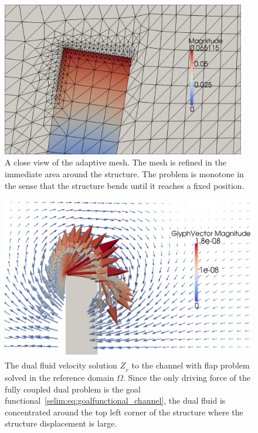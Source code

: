\begin{figure}
  \label{selim:fig:channel_zoom_mesh}
  \caption{A close view of the adaptive mesh. The mesh is refined in
    the immediate area around the structure. The problem is monotone
    in the sense that the structure bends until it reaches a fixed
    position.}
  \includegraphics[width=0.95\textwidth]{chapters/selim/png/channel_test_zoom.png}
\end{figure}
\begin{figure}
  \label{selim:fig:dual_channel_ZF}
\caption{The dual fluid velocity solution  $Z_{_{F}}$  to the channel with flap problem solved in
  the reference domain $\Omega$. Since the only
  driving force of the fully coupled dual problem is the goal
  functional~\ref{selim:eq:goalfunctional_channel}, the dual fluid is
  concentrated around the top left corner of the structure where the
  structure displacement is large.}
\includegraphics[width=1.0\textwidth]{chapters/selim/png/channelZF.png}
\end{figure}
